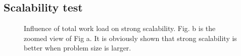 \documentclass[conference,compsoc]{IEEEtran}
\begin{document}
\subsection{Scalability test}
\begin{figure}[!t]
\centering
{}
\label{fig:plume_photo}
\hfil
{}
\label{fig:plume_simulation}
\caption{Influence of total work load on strong scalability. Fig. b is the zoomed view of Fig a. It is obviously shown that strong scalability is better when problem size is larger.}
\label{fig:2cases_efficiency}
\end{figure}
\end{document}
